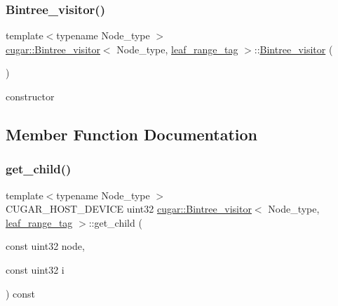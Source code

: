 \subsubsection{\texorpdfstring{Bintree\+\_\+visitor()}{Bintree\_visitor()}}
{\footnotesize\ttfamily template$<$typename Node\+\_\+type $>$ \\
\hyperlink{structcugar_1_1_bintree__visitor}{cugar\+::\+Bintree\+\_\+visitor}$<$ Node\+\_\+type, \hyperlink{structcugar_1_1leaf__range__tag}{leaf\+\_\+range\+\_\+tag} $>$\+::\hyperlink{structcugar_1_1_bintree__visitor}{Bintree\+\_\+visitor} (\begin{DoxyParamCaption}{ }\end{DoxyParamCaption})\hspace{0.3cm}{\ttfamily [inline]}}

constructor 

\subsection{Member Function Documentation}
\mbox{\label{structcugar_1_1_bintree__visitor_3_01_node__type_00_01leaf__range__tag_01_4_af6aee10fb70ea0776d23fb677e01796b}} 
\subsubsection{\texorpdfstring{get\+\_\+child()}{get\_child()}}
{\footnotesize\ttfamily template$<$typename Node\+\_\+type $>$ \\
C\+U\+G\+A\+R\+\_\+\+H\+O\+S\+T\+\_\+\+D\+E\+V\+I\+CE uint32 \hyperlink{structcugar_1_1_bintree__visitor}{cugar\+::\+Bintree\+\_\+visitor}$<$ Node\+\_\+type, \hyperlink{structcugar_1_1leaf__range__tag}{leaf\+\_\+range\+\_\+tag} $>$\+::get\+\_\+child (\begin{DoxyParamCaption}\item[{const uint32}]{node,  }\item[{const uint32}]{i }\end{DoxyParamCaption}) const\hspace{0.3cm}{\ttfamily [inline]}}


